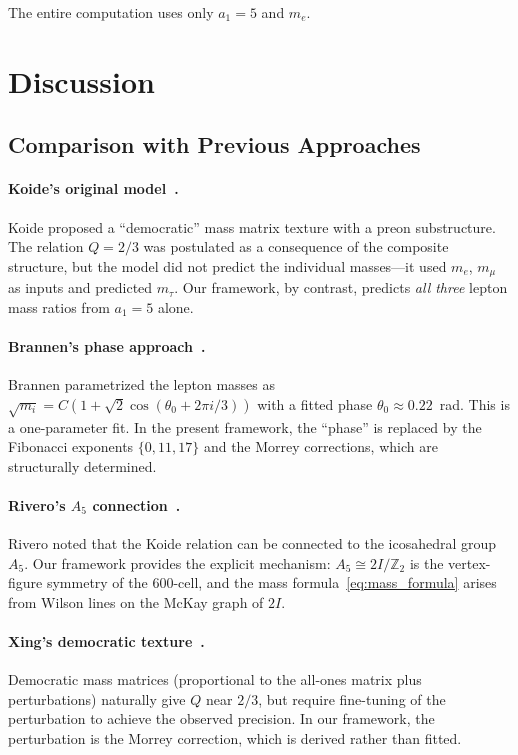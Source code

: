 \documentclass[12pt,a4paper]{article}
\theoremstyle{definition}
\begin{document}
\noindent The entire computation uses only $a_1 = 5$ and $m_e$.

\section{Discussion}
\label{sec:discussion}

\subsection{Comparison with Previous Approaches}

\paragraph{Koide's original model~\cite{Koide1983}.}  Koide proposed a ``democratic'' mass matrix texture with a preon substructure.  The relation $Q = 2/3$ was postulated as a consequence of the composite structure, but the model did not predict the individual masses---it used $m_e$, $m_\mu$ as inputs and predicted $m_\tau$.  Our framework, by contrast, predicts \emph{all three} lepton mass ratios from $a_1 = 5$ alone.

\paragraph{Brannen's phase approach~\cite{Brannen2006}.}  Brannen parametrized the lepton masses as $\sqrt{m_i} = C(1 + \sqrt{2}\cos(\theta_0 + 2\pi i/3))$ with a fitted phase $\theta_0 \approx 0.22$~rad.  This is a one-parameter fit.  In the present framework, the ``phase'' is replaced by the Fibonacci exponents $\{0, 11, 17\}$ and the Morrey corrections, which are structurally determined.

\paragraph{Rivero's $A_5$ connection~\cite{Rivero2005}.}  Rivero noted that the Koide relation can be connected to the icosahedral group $A_5$.  Our framework provides the explicit mechanism: $A_5 \cong 2I/\mathbb{Z}_2$ is the vertex-figure symmetry of the 600-cell, and the mass formula~\eqref{eq:mass_formula} arises from Wilson lines on the McKay graph of $2I$.

\paragraph{Xing's democratic texture~\cite{Xing2006}.}  Democratic mass matrices (proportional to the all-ones matrix plus perturbations) naturally give $Q$ near $2/3$, but require fine-tuning of the perturbation to achieve the observed precision.  In our framework, the perturbation is the Morrey correction, which is derived rather than fitted.
\end{document}
